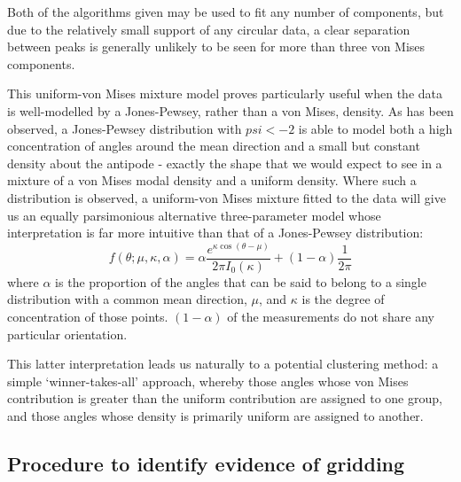 \documentclass[../../ArchStats.tex]{subfiles}
\begin{document}
Both of the algorithms given may be used to fit any number of components, but due to the relatively small support of any circular data, a clear separation between peaks is generally unlikely to be seen for more than three von Mises components. 

This uniform-von Mises mixture model proves particularly useful when the data is well-modelled by a Jones-Pewsey, rather than a von Mises, density. As has been observed, a Jones-Pewsey distribution with $psi < -2$ is able to model both  a high concentration of angles around the mean direction and a small but constant density about the antipode - exactly the shape that we would expect to see in a mixture of a von Mises modal density and a uniform density.   Where such a distribution is observed, a uniform-von Mises mixture fitted to the data will give us an equally parsimonious alternative three-parameter model whose interpretation is far more intuitive than that of a Jones-Pewsey distribution:
\begin{equation}
f(\theta; \mu, \kappa, \alpha) = \alpha \frac{e^{\kappa \cos(\theta - \mu)}}{2\pi I_0(\kappa)} + (1-\alpha)\frac{1}{2\pi}
\end{equation}
where $\alpha$ is the proportion of the angles that can be said to belong to a single distribution with a common mean direction, $\mu$, and $\kappa$ is the degree of concentration of those points. $(1-\alpha)$ of the measurements do not share any particular orientation. 

This latter interpretation leads us naturally to a  potential clustering method: a simple `winner-takes-all' approach, whereby those angles whose von Mises contribution is greater than the uniform contribution are assigned to one group, and those angles whose density is primarily uniform are assigned to another. 





\subsection{Procedure to identify evidence of gridding}
\end{document}
